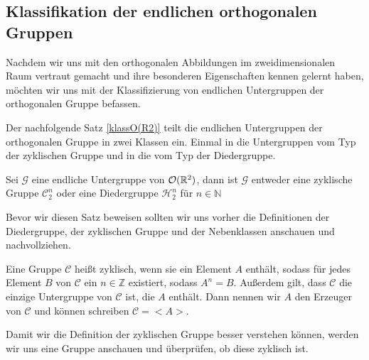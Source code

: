 \subsection{Klassifikation der endlichen orthogonalen Gruppen}
Nachdem wir uns mit den orthogonalen Abbildungen im zweidimensionalen Raum vertraut gemacht und ihre besonderen Eigenschaften kennen gelernt haben, möchten wir uns mit der Klassifizierung von endlichen Untergruppen der orthogonalen Gruppe befassen. 

Der nachfolgende Satz \ref{klassO(R2)} teilt die endlichen Untergruppen der orthogonalen Gruppe in zwei Klassen ein. Einmal in die Untergruppen vom Typ der zyklischen Gruppe und in die vom Typ der Diedergruppe.
\begin{theorem}\label{klassO(R2)}
	Sei $\mathcal{G}$ eine endliche Untergruppe von ${\mathcal{O}(\mathbb{R}^2)}$, dann ist $\mathcal{G}$ entweder eine zyklische Gruppe $\mathcal{C}^n_2$ oder eine Diedergruppe $\mathcal{H}^n_2$ für $n \in \mathbb{N}$
\end{theorem}
Bevor wir diesen Satz beweisen sollten wir uns vorher die Definitionen der Diedergruppe, der zyklischen Gruppe und der Nebenklassen anschauen und nachvollziehen.
\begin{defi}
	Eine Gruppe $\mathcal{C}$ heißt zyklisch, wenn sie ein Element $A$ enthält, sodass für jedes Element $B$ von $\mathcal{C}$ ein $n \in \mathbb{Z}$ existiert, sodass $A^n = B$. Außerdem gilt, dass $\mathcal{C}$ die einzige Untergruppe von $\mathcal{C}$ ist, die $A$ enthält. Dann nennen wir $A$ den Erzeuger von $\mathcal{C}$ und können schreiben $\mathcal{C} = <A>$.
\end{defi}
Damit wir die Definition der zyklischen Gruppe besser verstehen können, werden wir uns eine Gruppe anschauen und überprüfen, ob diese zyklisch ist. 

